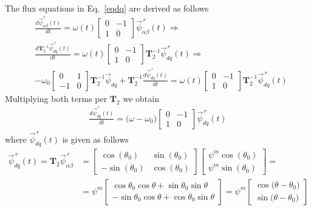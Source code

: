 \documentclass[11pt,a4paper]{article}
\numberwithin{equation}{section}
\theoremstyle{it}
\theoremstyle{definition}
\begin{document}
\begin{onehalfspace}
The flux equations in Eq.~\eqref{eqdq} are derived as follows
\begin{equation}
	\begin{aligned}
		& \frac{d\vec{\psi}^{\,r}_{\alpha\beta}(t)}{dt} = \omega(t) \begin{bmatrix} 0 & -1 \\ 1 & 0\end{bmatrix} \vec{\psi}^{\,r}_{\alpha\beta}(t) \Rightarrow \\[6pt]
		& \frac{d\mathbf{T}_2^{-1}\vec{\psi}^{\,r}_{dq}(t)}{dt} = \omega(t) \begin{bmatrix} 0 & -1 \\ 1 & 0\end{bmatrix} \mathbf{T}_2^{-1}\vec{\psi}^{\,r}_{dq}(t) \Rightarrow \\[6pt]
		&- \omega_0\begin{bmatrix} 0 & 1\\-1 & 0 \end{bmatrix}\mathbf{T}_2^{-1}\vec{\psi}_{dq} + \mathbf{T}_2^{-1}\frac{d\vec{\psi}^{\,r}_{dq}(t)}{dt} = \omega(t) \begin{bmatrix} 0 & -1 \\ 1 & 0\end{bmatrix} \mathbf{T}_2^{-1}\vec{\psi}^{\,r}_{dq}(t)
	\end{aligned}
\end{equation}
Multiplying both terms per $\mathbf{T}_2$ we obtain
\begin{equation}
	\begin{aligned}
		\frac{d\vec{\psi}^{\,r}_{dq}(t)}{dt} = \big(\omega-\omega_0\big)\begin{bmatrix} 0 & -1 \\ 1 & 0\end{bmatrix} \vec{\psi}^{\,r}_{dq}(t)
	\end{aligned}
\end{equation}
where $\vec{\psi}^{\,r}_{dq}(t)$ is given as follows
\begin{equation}
	\begin{aligned}
		\vec{\psi}^{\,r}_{dq}(t) = \mathbf{T}_2\vec{\psi}^{\,r}_{\alpha\beta} &= \begin{bmatrix} \cos(\theta_0) & \sin(\theta_0) \\[6pt] -\sin(\theta_0) & \cos(\theta_0) \end{bmatrix} \begin{bmatrix} \psi^m\cos(\theta_0) \\[6pt] \psi^m\sin(\theta_0) \end{bmatrix} = \\[6pt]
		&=\psi^m \begin{bmatrix} \cos\theta_0\cos\theta + \sin\theta_0\sin\theta \\[6pt] -\sin\theta_0\cos\theta+\cos\theta_0\sin\theta\end{bmatrix} =  \psi^m\begin{bmatrix} \cos\big(\theta -\theta_0\big) \\[6pt] \sin\big(\theta -\theta_0\big)\end{bmatrix}
	\end{aligned}
\end{equation}


\end{onehalfspace}
\end{document}
